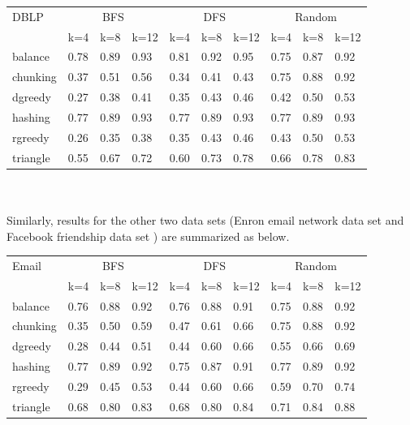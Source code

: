 \documentclass[12pt]{article}
\begin{document}
\begin{tabular}{llllllllll}
\toprule 
    DBLP & \multicolumn{3}{c}{BFS} & \multicolumn{3}{c}{DFS} & \multicolumn{3}{c}{Random}\\

    & k=4 & k=8 & k=12
    & k=4 & k=8 & k=12
     & k=4 & k=8 & k=12  \\
    \midrule
    balance &    0.78 	& 0.89 	& 0.93 &	 0.81 &	 0.92 &	 0.95 &	 0.75 &	 0.87 &	 0.92   \\
chunking&	 0.37 &	 0.51 &	 0.56 &	 0.34 &	 0.41 &	 0.43 &	 0.75 &	 0.88 &	 0.92 \\
dgreedy&	 0.27 &	 0.38& 	 0.41 & 	 0.35 & 	 0.43 & 	 0.46 & 	 0.42 &  	 0.50 & 	 0.53 \\
hashing&	 0.77 &	 0.89 & 	 0.93 & 	 0.77 & 	 0.89 & 	 0.93 & 	 0.77 & 	 0.89 & 	 0.93 \\
rgreedy	& 0.26 &	 0.35 & 	 0.38 & 	 0.35 & 	 0.43 & 	 0.46 & 	 0.43 & 	 0.50 & 	 0.53 \\
triangle	 &0.55 &	 0.67 & 	 0.72 & 	 0.60 & 	 0.73 & 	 0.78 & 	 0.66 & 	 0.78 & 	 0.83 \\
    \bottomrule
\end{tabular}
\\
\\

Similarly, results for the other two data sets (Enron email network data set and Facebook friendship data set ) are summarized as below.\\

\begin{tabular}{llllllllll}
\toprule 
    Email & \multicolumn{3}{c}{BFS} & \multicolumn{3}{c}{DFS} & \multicolumn{3}{c}{Random}\\

    & k=4 & k=8 & k=12
    & k=4 & k=8 & k=12
     & k=4 & k=8 & k=12  \\
    \midrule
    balance &  0.76 &	 0.88 &	 0.92 &	 0.76 &	 0.88 &	 0.91 &	 0.75 &	 0.88 &	 0.92 \\
chunking&	 0.35 &	 0.50 &	 0.59 &	 0.47 &	 0.61 &	 0.66 &	 0.75 &	 0.88 &	 0.92 \\
dgreedy&	 0.28 &	 0.44 &	 0.51 &	 0.44 &	 0.60 &	 0.66 &	 0.55 &	 0.66 &	 0.69 \\
hashing&	   0.77& 	 0.89 &	 0.92 &	 0.75 &	 0.87 &	 0.91 &	 0.77 &	 0.89 &	 0.92 \\
rgreedy&	   0.29& 	 0.45 &	 0.53 &	 0.44 &	 0.60 &	 0.66 &	 0.59 &	 0.70 &	 0.74 \\
triangle&	   0.68& 	 0.80 &	 0.83 &	 0.68 &	 0.80 &	 0.84 &	 0.71 &	 0.84 &	 0.88 \\
    \bottomrule
\end{tabular}
\end{document}
